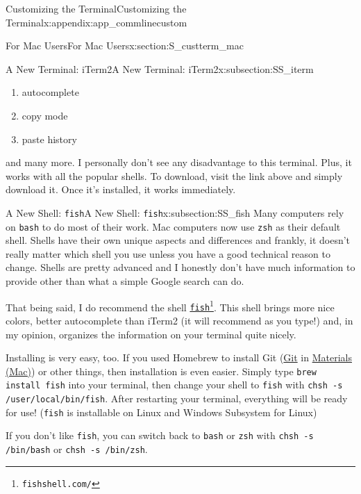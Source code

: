 \documentclass[oneside,10pt,]{book}
\newcommand{\mono}[1]{\texttt{#1}}
\begin{document}
\begin{appendixptx}{Customizing the Terminal}{}{Customizing the Terminal}{}{}{x:appendix:app_commlinecustom}
\begin{sectionptx}{For Mac Users}{}{For Mac Users}{}{}{x:section:S_custterm_mac}
\begin{subsectionptx}{A New Terminal: iTerm2}{}{A New Terminal: iTerm2}{}{}{x:subsection:SS_iterm}
\begin{enumerate}
\item{}autocomplete%
\item{}copy mode%
\item{}paste history%
\end{enumerate}
and many more. I personally don't see any disadvantage to this terminal. Plus, it works with all the popular shells. To download, visit the link above and simply download it. Once it's installed, it works immediately.%
\end{subsectionptx}
%
%
\typeout{************************************************}
\typeout{Subsection A.1.2 A New Shell: \mono{fish}}
\typeout{************************************************}
%
\begin{subsectionptx}{A New Shell: \mono{fish}}{}{A New Shell: \mono{fish}}{}{}{x:subsection:SS_fish}
%
%
Many computers rely on \mono{bash} to do most of their work. Mac computers now use \mono{zsh} as their default shell. Shells have their own unique aspects and differences and frankly, it doesn't really matter which shell you use unless you have a good technical reason to change. Shells are pretty advanced and I honestly don't have much information to provide other than what a simple Google search can do.%
\par
That being said, I do recommend the shell \href{https://fishshell.com/}{\mono{fish}}\footnote{\nolinkurl{fishshell.com/}\label{g:fn:idp616889016}}. This shell brings more nice colors, better autocomplete than iTerm2 (it will recommend as you type!) and, in my opinion, organizes the information on your terminal quite nicely.%
\par
Installing is very easy, too. If you used Homebrew to install Git (\hyperlink{x:paragraphs:install-git-mac}{Git} in \hyperref[x:preface:materials-mac]{Materials (Mac)}) or other things, then installation is even easier. Simply type \mono{brew install fish} into your terminal, then change your shell to \mono{fish} with \mono{chsh -s /user/local/bin/fish}. After restarting your terminal, everything will be ready for use! (\mono{fish} is installable on Linux and Windows Subsystem for Linux)%
\par
If you don't like \mono{fish}, you can switch back to \mono{bash} or \mono{zsh} with \mono{chsh -s /bin/bash} or \mono{chsh -s /bin/zsh}.%
\end{subsectionptx}
\end{sectionptx}
%
%
\typeout{************************************************}

\end{appendixptx}
\end{document}
